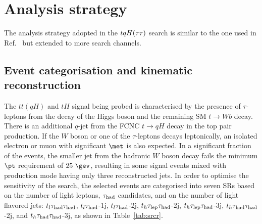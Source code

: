 \section{Analysis strategy}
\label{sec:strategy_Htautau}

The analysis strategy adopted in the $tqH(\tau\tau)$ search is similar to the one used in Ref.~\cite{fcnc36,Chen:2015nta} but extended to more search channels.

\subsection{Event categorisation and kinematic reconstruction}
\label{sec:htautau_reco_cat}

The $tt(qH)$ and $tH$ signal being probed is characterised by the presence of $\tau$-leptons from the decay of 
the Higgs boson and the remaining SM $t\to Wb$ decay. There is an additional $q$-jet from the FCNC $t\to qH$ decay in the top pair production. 
If the $W$ boson or one of the $\tau$-leptons decays leptonically, an isolated electron or muon with significant $\met$ is also expected.
In a significant fraction of the events, the smaller jet from the hadronic $W$ boson decay fails the minimum $\pt$ requirement of $25~\gev$,
resulting in some signal events mixed with production mode having only three reconstructed jets.
In order to optimise the sensitivity of the search, the selected events are categorised into seven SRs based on the number of light leptons,
$\tau_{\mathrm{had}}$ candidates, and on the number of light flavored jets:
$t_l\tau_{\mathrm{had}} \tau_{\mathrm{had}}$, $t_l\tau_{\mathrm{had}}$-1j, $t_l\tau_{\mathrm{had}}$-2j, $t_h\tau_{\mathrm{lep}} \tau_{\mathrm{had}}$-2j, $t_h\tau_{\mathrm{lep}} \tau_{\mathrm{had}}$-3j, $t_h\tau_{\mathrm{had}} \tau_{\mathrm{had}}$-2j, and $t_h\tau_{\mathrm{had}} \tau_{\mathrm{had}}$-3j, as shown in Table~\ref{tab:srcr}. 

